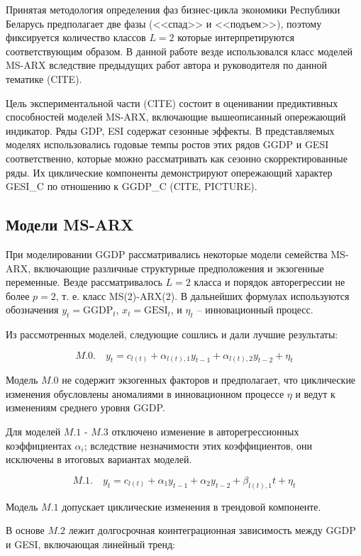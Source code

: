 \documentclass[a4paper,14pt]{extreport}
\begin{document}
Принятая методология определения фаз бизнес-цикла экономики Республики Беларусь предполагает две фазы (<<спад>> и <<подъем>>), поэтому фиксируется количество классов $L=2$ которые интерпретируются соответствующим образом. В данной работе везде использовался класс моделей MS-ARX вследствие предыдущих работ автора и руководителя по данной тематике (CITE).

Цель экспериментальной части (CITE) состоит в оценивании предиктивных способностей моделей MS-ARX, включающие вышеописанный опережающий индикатор. Ряды GDP, ESI содержат сезонные эффекты. В представляемых моделях использовались годовые темпы ростов этих рядов GGDP и GESI соответственно, которые можно рассматривать как сезонно скорректированные ряды. Их циклические компоненты демонстрируют опережающий характер GESI\_C по отношению к GGDP\_C (CITE, PICTURE).

\subsection{Модели MS-ARX}


При моделировании GGDP рассматривались некоторые модели семейства MS-ARX, включающие различные структурные предположения и экзогенные переменные. Везде рассматривалось $L=2$ класса и порядок авторегрессии не более $p=2$, т. е. класс MS(2)-ARX(2). В дальнейших формулах используются обозначения $y_t = \text{GGDP}_t$, $x_t = \text{GESI}_t$, и $\eta_t$ -- инновационный процесс.

Из рассмотренных моделей, следующие сошлись и дали лучшие результаты:

\[
	M.0. \quad y_t = c_{l(t)} + \alpha_{l(t), 1} y_{t-1} + \alpha_{l(t), 2} y_{t-2} + \eta_t
\]

Модель $M.0$ не содержит экзогенных факторов и предполагает, что циклические изменения обусловлены аномалиями в инновационном процессе $\eta$ и ведут к изменениям среднего уровня GGDP.

Для моделей $M.1$ - $M.3$ отключено изменение в авторегрессионных коэффициентах $\alpha_i$; вследствие незначимости этих коэффициентов, они исключены в итоговых вариантах моделей.

\[
	M.1. \quad y_t = c_{l(t)} + \alpha_1 y_{t-1} + \alpha_2 y_{t-2} + \beta_{l(t), 1} t + \eta_t
\]

Модель $M.1$ допускает циклические изменения в трендовой компоненте. 


В основе $M.2$ лежит долгосрочная коинтеграционная зависимость между GGDP и GESI, включающая линейный тренд:
\end{document}
